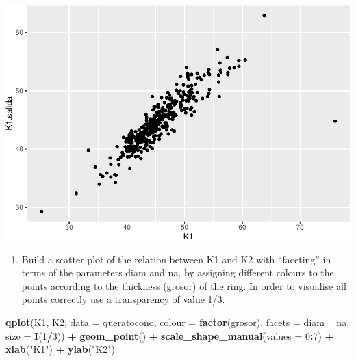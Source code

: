 \documentclass[
]{article}
\newenvironment{Shaded}{\begin{snugshade}}{\end{snugshade}}
\newcommand{\DataTypeTok}[1]{\textcolor[rgb]{0.13,0.29,0.53}{#1}}
\newcommand{\DecValTok}[1]{\textcolor[rgb]{0.00,0.00,0.81}{#1}}
\newcommand{\KeywordTok}[1]{\textcolor[rgb]{0.13,0.29,0.53}{\textbf{#1}}}
\newcommand{\NormalTok}[1]{#1}
\newcommand{\OperatorTok}[1]{\textcolor[rgb]{0.81,0.36,0.00}{\textbf{#1}}}
\newcommand{\StringTok}[1]{\textcolor[rgb]{0.31,0.60,0.02}{#1}}
\providecommand{\tightlist}{%
  \setlength{\itemsep}{0pt}\setlength{\parskip}{0pt}}
\begin{document}
\includegraphics{document_files/figure-latex/unnamed-chunk-5-1.pdf}

\begin{enumerate}
\def\labelenumi{\arabic{enumi}.}
\setcounter{enumi}{4}
\tightlist
\item
  Build a scatter plot of the relation between K1 and K2 with
  ``faceting'' in terms of the parameters diam and na, by assigning
  different colours to the points according to the thickness (grosor) of
  the ring. In order to visualise all points correctly use a
  transparency of value 1/3.
\end{enumerate}

\begin{Shaded}
\begin{Highlighting}[]
\KeywordTok{qplot}\NormalTok{(K1, K2, }\DataTypeTok{data =}\NormalTok{ queratocono, }\DataTypeTok{colour =} \KeywordTok{factor}\NormalTok{(grosor), }\DataTypeTok{facets =}\NormalTok{ diam }\OperatorTok{~}\StringTok{ }\NormalTok{na, }
      \DataTypeTok{size =} \KeywordTok{I}\NormalTok{(}\DecValTok{1}\OperatorTok{/}\DecValTok{3}\NormalTok{)) }\OperatorTok{+}
\StringTok{      }\KeywordTok{geom_point}\NormalTok{() }\OperatorTok{+}\StringTok{ }
\StringTok{      }\KeywordTok{scale_shape_manual}\NormalTok{(}\DataTypeTok{values =} \DecValTok{0}\OperatorTok{:}\DecValTok{7}\NormalTok{) }\OperatorTok{+}
\StringTok{      }\KeywordTok{xlab}\NormalTok{(}\StringTok{"K1"}\NormalTok{) }\OperatorTok{+}\StringTok{ }\KeywordTok{ylab}\NormalTok{(}\StringTok{"K2"}\NormalTok{)}
\end{Highlighting}
\end{Shaded}
\end{document}
